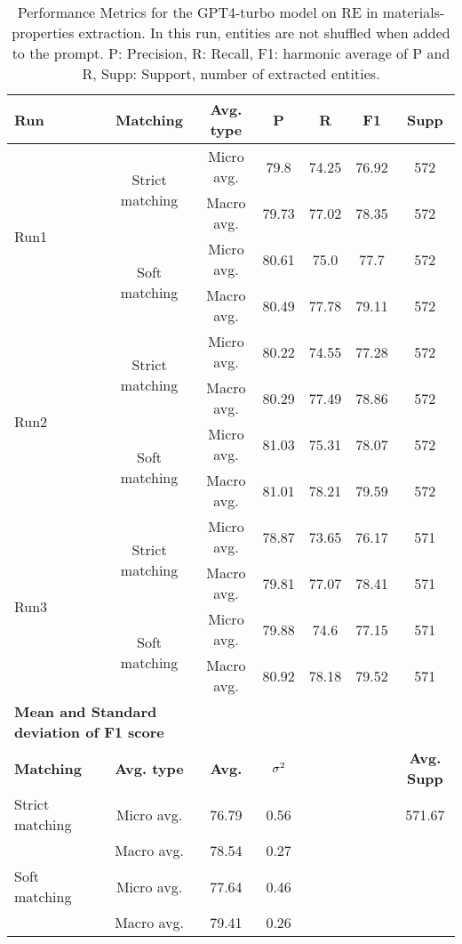 \begin{table}[htbp]
    \small
    \centering
    \caption{Performance Metrics for the GPT4-turbo model on RE in materials-properties extraction. In this run, entities are not shuffled when added to the prompt. P: Precision, R: Recall, F1: harmonic average of P and R, Supp: Support, number of extracted entities.}
    \begin{tabular}{lcccccc}
        \toprule
        \textbf{Run} & \textbf{Matching} & \textbf{Avg. type} & \textbf{P} & \textbf{R} & \textbf{F1} & \textbf{Supp} \\
        \midrule
        \multirow{4}{*}{Run1} & \multirow{2}{*}{Strict matching} & Micro avg. & 79.8 & 74.25 & 76.92 & 572 \\
        & & Macro avg. & 79.73 & 77.02 & 78.35 & 572 \\
        \cmidrule{2-7}
        & \multirow{2}{*}{Soft matching} & Micro avg. & 80.61 & 75.0 & 77.7 & 572 \\
        & & Macro avg. & 80.49 & 77.78 & 79.11 & 572 \\
        \midrule
        \multirow{4}{*}{Run2} & \multirow{2}{*}{Strict matching} & Micro avg. & 80.22 & 74.55 & 77.28 & 572 \\
        & & Macro avg. & 80.29 & 77.49 & 78.86 & 572 \\
        \cmidrule{2-7}
        & \multirow{2}{*}{Soft matching} & Micro avg. & 81.03 & 75.31 & 78.07 & 572 \\
        & & Macro avg. & 81.01 & 78.21 & 79.59 & 572 \\
        \midrule
        \multirow{4}{*}{Run3} & \multirow{2}{*}{Strict matching} & Micro avg. & 78.87 & 73.65 & 76.17 & 571 \\
        & & Macro avg. & 79.81 & 77.07 & 78.41 & 571 \\
        \cmidrule{2-7}
        & \multirow{2}{*}{Soft matching} & Micro avg. & 79.88 & 74.6 & 77.15 & 571 \\
        & & Macro avg. & 80.92 & 78.18 & 79.52 & 571 \\
        \midrule
        \multicolumn{2}{l}{\textbf{Mean and Standard deviation of F1 score}} & & & & & \\
        \midrule
        \textbf{Matching} & \textbf{Avg. type} & \textbf{Avg.} & $\sigma\textsuperscript{2}$ & & & \textbf{Avg. Supp}\\
        Strict matching & Micro avg. & 76.79 & 0.56 & & & 571.67 \\
        & Macro avg. & 78.54 & 0.27 & & & \\
        Soft matching & Micro avg. & 77.64 & 0.46 & & \\
        & Macro avg. & 79.41 & 0.26 & & \\
        \bottomrule
    \end{tabular}
\end{table}

